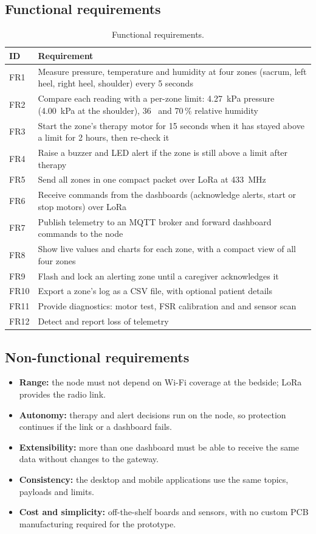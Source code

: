 \subsection{Functional requirements}
{\small{}
\begin{table}[H]
\centering
\begin{tabularx}{\textwidth}{@{}lX@{}}
\toprule
\textbf{ID} & \textbf{Requirement}\\
\midrule
FR1 & Measure pressure, temperature and humidity at four zones (sacrum, left heel, right heel, shoulder) every 5 seconds\\
FR2 & Compare each reading with a per-zone limit: 4.27~kPa pressure (4.00~kPa at the shoulder), 36~\degC{} and 70\,\% relative humidity\\
FR3 & Start the zone's therapy motor for 15 seconds when it has stayed above a limit for 2 hours, then re-check it\\
FR4 & Raise a buzzer and LED alert if the zone is still above a limit after therapy\\
FR5 & Send all zones in one compact packet over LoRa at 433~MHz\\
FR6 & Receive commands from the dashboards (acknowledge alerts, start or stop motors) over LoRa\\
FR7 & Publish telemetry to an MQTT broker and forward dashboard commands to the node\\
FR8 & Show live values and charts for each zone, with a compact view of all four zones\\
FR9 & Flash and lock an alerting zone until a caregiver acknowledges it\\
FR10 & Export a zone's log as a CSV file, with optional patient details\\
FR11 & Provide diagnostics: motor test, FSR calibration and \itwoc{} and sensor scan\\
FR12 & Detect and report loss of telemetry\\
\bottomrule
\end{tabularx}
\caption{Functional requirements.}
\end{table}}

\subsection{Non-functional requirements}
\begin{itemize}
\item \textbf{Range:} the node must not depend on Wi-Fi coverage at the bedside; LoRa provides the radio link.
\item \textbf{Autonomy:} therapy and alert decisions run on the node, so protection continues if the link or a dashboard fails.
\item \textbf{Extensibility:} more than one dashboard must be able to receive the same data without changes to the gateway.
\item \textbf{Consistency:} the desktop and mobile applications use the same topics, payloads and limits.
\item \textbf{Cost and simplicity:} off-the-shelf boards and sensors, with no custom PCB manufacturing required for the prototype.
\end{itemize}

